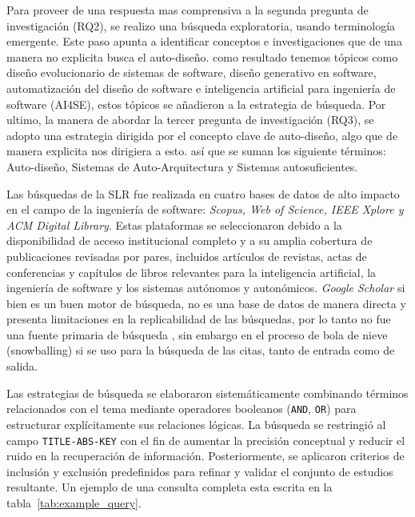 \documentclass[12pt, letterpaper, oneside]{book}
\begin{document}
Para proveer de una respuesta mas comprensiva a la segunda pregunta de investigación (RQ2), se realizo una búsqueda exploratoria, usando terminología emergente. Este paso apunta a identificar conceptos e investigaciones que de una manera no explicita busca el auto-diseño. como resultado tenemos tópicos como diseño evolucionario de sistemas de software, diseño generativo en software, automatización del diseño de software e inteligencia artificial para ingeniería de software (AI4SE), estos tópicos se añadieron a la estrategia de búsqueda.
Por ultimo, la manera de abordar la tercer pregunta de investigación (RQ3), se adopto una estrategia dirigida por el concepto clave de auto-diseño, algo que de manera explicita nos dirigiera a esto. así que se suman los siguiente términos:
Auto-diseño,  Sistemas de Auto-Arquitectura y Sistemas autosuficientes.

Las búsquedas de la SLR fue realizada en cuatro bases de datos de alto impacto en el campo de la ingeniería de software: \textit{Scopus, Web of Science, IEEE Xplore y ACM Digital Library}. 
Estas plataformas se seleccionaron debido a la disponibilidad de acceso institucional completo y a su amplia cobertura de publicaciones revisadas por pares, incluidos artículos de revistas, actas de conferencias y capítulos de libros relevantes para la inteligencia artificial, la ingeniería de software y los sistemas autónomos y autonómicos.
 \textit{Google Scholar} si bien es un buen motor de búsqueda, no es una base de datos de manera directa y presenta limitaciones en la replicabilidad de las búsquedas, por lo tanto no fue una fuente primaria de búsqueda \cite{Gusenbauer2020}, sin embargo en el proceso de bola de nieve (snowballing) si se uso para la búsqueda de las citas, tanto de entrada como de salida.
 
 Las estrategias de búsqueda se elaboraron sistemáticamente combinando términos relacionados con el tema mediante operadores booleanos (\texttt{AND}, \texttt{OR}) para estructurar explícitamente sus relaciones lógicas. La búsqueda se restringió al campo \texttt{TITLE-ABS-KEY} con el fin de aumentar la precisión conceptual y reducir el ruido en la recuperación de información. Posteriormente, se aplicaron criterios de inclusión y exclusión predefinidos para refinar y validar el conjunto de estudios resultante. Un ejemplo de una consulta completa esta escrita en la tabla~\ref{tab:example_query}.
 
\end{document}
